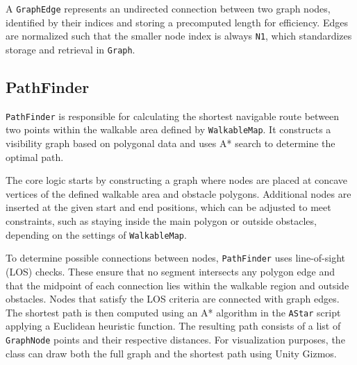  A \verb|GraphEdge| represents an undirected connection between two graph nodes, identified by their indices and storing a precomputed length for efficiency. Edges are normalized such that the smaller node index is always \verb|N1|, which standardizes storage and retrieval in \verb|Graph|.


\subsection{PathFinder}
\verb|PathFinder| is responsible for calculating the shortest navigable route between two points within the walkable area defined by \verb|WalkableMap|. It constructs a visibility graph based on polygonal data and uses A* search to determine the optimal path.

The core logic starts by constructing a graph where nodes are placed at concave vertices of the defined walkable area and obstacle polygons. Additional nodes are inserted at the given start and end positions, which can be adjusted to meet constraints, such as staying inside the main polygon or outside obstacles, depending on the settings of \verb|WalkableMap|.

To determine possible connections between nodes, \verb|PathFinder| uses line-of-sight (LOS) checks. These ensure that no segment intersects any polygon edge and that the midpoint of each connection lies within the walkable region and outside obstacles. Nodes that satisfy the LOS criteria are connected with graph edges. The shortest path is then computed using an A* algorithm in the \verb|AStar| script applying a Euclidean heuristic function.  The resulting path consists of a list of \verb|GraphNode| points and their respective distances. For visualization purposes, the class can draw both the full graph and the shortest path using Unity Gizmos.




